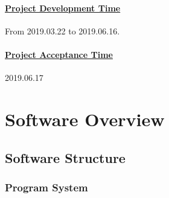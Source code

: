\documentclass[10pt]{article}
\begin{document}
\paragraph{\underline{Project Development Time}} 
From 2019.03.22 to 2019.06.16.

\paragraph{\underline{Project Acceptance Time}} 
2019.06.17

\section{Software Overview}
\subsection{Software Structure}
\subsubsection{Program System}
\end{document}
